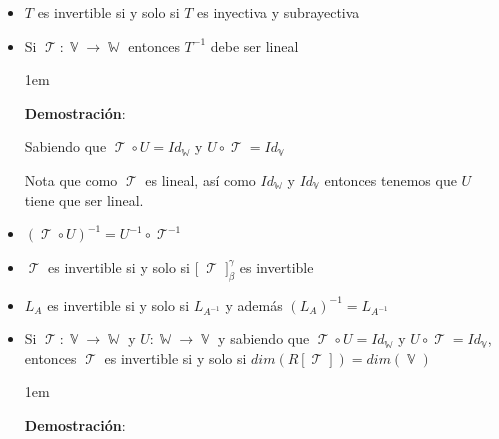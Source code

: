 \documentclass[12pt, fleqn]{report}                             %
\newenvironment{SmallIndentation}[1][0.75em]                    %
        {\begin{adjustwidth}{#1}{}\begin{footnotesize}}             %
        {\end{footnotesize}\end{adjustwidth}}                       %
\theoremstyle{break}                                            %
\DeclareMathOperator \VectorSet    {\mathbb{V}}                 %
\DeclareMathOperator \SubVectorSet {\mathbb{W}}                 %
\DeclareMathOperator \LinTrans {\mathcal{T}}                    %
\newcommand{\bigBrackets}[1] {\big[ \; #1 \; \big]}             %
\begin{document}
                \begin{itemize}

                    \item
                        $T$ es invertible si y solo si $T$ es inyectiva y subrayectiva

                    \item
                        Si $\LinTrans: \VectorSet \to \SubVectorSet$ entonces $T^{-1}$ debe ser lineal

                        \begin{SmallIndentation}[1em]
                            \textbf{Demostración}:

                            Sabiendo que $\LinTrans \circ U = Id_{\SubVectorSet}$ y 
                            $U \circ \LinTrans = Id_{\VectorSet}$
                            
                            Nota que como $\LinTrans$ es lineal, así como $Id_{\SubVectorSet}$ y
                            $Id_{\VectorSet}$ entonces tenemos que $U$ tiene que ser lineal.
                        
                        \end{SmallIndentation}
                            

                    \item 
                        $(\LinTrans \circ U)^{-1} = U^{-1} \circ \LinTrans^{-1}$

                    \item
                        $\LinTrans$ es invertible si y solo si $\bigBrackets{\LinTrans}_\beta^\gamma$ es invertible

                    \item
                        $L_A$ es invertible si y solo si $L_{A^{-1}}$ 
                            y además $(L_{A})^{-1} = L_{A^{-1}}$

                    \item
                        Si $\LinTrans: \VectorSet \to \SubVectorSet$ y $U: \SubVectorSet \to \VectorSet$
                        y sabiendo que $\LinTrans \circ U = Id_{\SubVectorSet}$ y 
                        $U \circ \LinTrans = Id_{\VectorSet}$, entonces
                        $\LinTrans$ es invertible si y solo si $dim(R[\LinTrans]) = dim(\VectorSet)$

                        \begin{SmallIndentation}[1em]
                            \textbf{Demostración}:
                            

\end{SmallIndentation}
\end{itemize}
\end{document}
